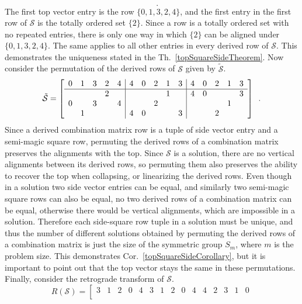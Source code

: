 \begin{example}
\begin{equation}
\begin{split}
	\end{split} \enspace .
	\end{equation}
	The first top vector entry is the row $\{0, 1, 3, 2, 4\}$, and the first entry in the first row of $\mathcal{S}$ is the totally ordered set $\{2\}$. Since a row is a totally ordered set with no repeated entries, there is only one way in which $\{2\}$ can be aligned under $\{0, 1, 3, 2, 4\}$. The same applies to all other entries in every derived row of $\mathcal{S}$. This demonstrates the uniqueness stated in the Th.~\ref{topSquareSideTheorem}. Now consider the permutation of the derived rows of $\mathcal{S}$ given by $\tilde{\mathcal{S}}$.
	\pagebreak
	\begin{equation}
    	\tilde{\mathcal{S}} = \left[
    	\begin{array}{ccccc|ccccc|ccccc}
        	0 & 1 & 3 & 2 & 4 & 4 & 0 & 2 & 1 & 3 & 4 & 0 & 2 & 1 & 3 \\
        	\hline
        	&&& 2 &&&&& 1 && 4 & 0 &&& 3 \\
        	0 && 3 && 4 &&& 2 &&&&&& 1 & \\
        	& 1 &&&& 4 & 0 &&& 3 &&& 2 &&
    	\end{array}
    	\right] \enspace.
	\end{equation}
	Since a derived combination matrix row is a tuple of side vector entry and a semi-magic square row, permuting the derived rows of a combination matrix preserves the alignments with the top. Since $\mathcal{S}$ is a solution, there are no vertical alignments between its derived rows, so permuting them also preserves the ability to recover the top when collapsing, or linearizing the derived rows. Even though in a solution two side vector entries can be equal, and similarly two semi-magic square rows can also be equal, no two derived rows of a combination matrix can be equal, otherwise there would be vertical alignments, which are impossible in a solution. Therefore each side-square row tuple in a solution must be unique, and thus the number of different solutions obtained by permuting the derived rows of a combination matrix is just the size of the symmetric group $S_m$, where $m$ is the problem size. This demonstrates Cor.~\ref{topSquareSideCorollary}, but it is important to point out that the top vector stays the same in these permutations. Finally, consider the retrograde transform of $\mathcal{S}$.
	\begin{equation}
    	R(\mathcal{S}) = \left[
    	\begin{array}{ccccc|ccccc|ccccc}
        	3 & 1 & 2 & 0 & 4 & 3 & 1 & 2 & 0 & 4 & 4 & 2 & 3 & 1 & 0 \\

\end{array}
\end{equation}
\end{example}

